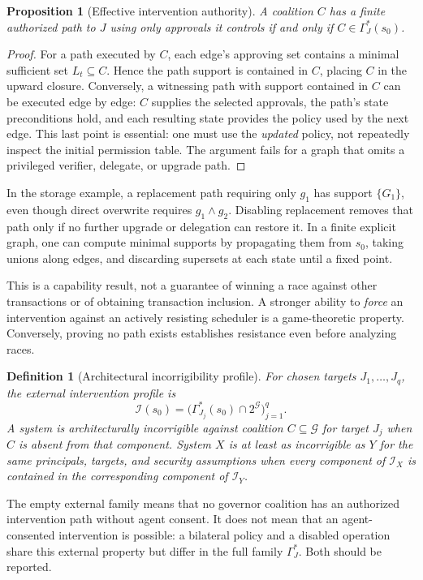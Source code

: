 \documentclass[10pt,letterpaper]{article}
\newtheorem{definition}{Definition}
\newtheorem{proposition}{Proposition}
\newcommand{\G}{\mathcal G}
\begin{document}
\begin{proposition}[Effective intervention authority]
\label{thm:closure}
A coalition $C$ has a finite authorized path to $J$ using only approvals it controls if and only if $C\in\Gamma_J^*(s_0)$.
\end{proposition}
\begin{proof}
For a path executed by $C$, each edge's approving set contains a minimal sufficient set $L_t\subseteq C$. Hence the path support is contained in $C$, placing $C$ in the upward closure. Conversely, a witnessing path with support contained in $C$ can be executed edge by edge: $C$ supplies the selected approvals, the path's state preconditions hold, and each resulting state provides the policy used by the next edge. This last point is essential: one must use the \emph{updated} policy, not repeatedly inspect the initial permission table. The argument fails for a graph that omits a privileged verifier, delegate, or upgrade path.
\end{proof}

In the storage example, a replacement path requiring only $g_1$ has support $\{G_1\}$, even though direct overwrite requires $g_1\land g_2$. Disabling replacement removes that path only if no further upgrade or delegation can restore it. In a finite explicit graph, one can compute minimal supports by propagating them from $s_0$, taking unions along edges, and discarding supersets at each state until a fixed point.

This is a capability result, not a guarantee of winning a race against other transactions or of obtaining transaction inclusion. A stronger ability to \emph{force} an intervention against an actively resisting scheduler is a game-theoretic property. Conversely, proving no path exists establishes resistance even before analyzing races.

\begin{definition}[Architectural incorrigibility profile]
For chosen targets $J_1,\ldots,J_q$, the external intervention profile is
\[
 \mathcal I(s_0)=\bigl(\Gamma_{J_j}^*(s_0)\cap2^{\G}\bigr)_{j=1}^q.
\]
A system is architecturally incorrigible against coalition $C\subseteq\G$ for target $J_j$ when $C$ is absent from that component. System $X$ is at least as incorrigible as $Y$ for the same principals, targets, and security assumptions when every component of $\mathcal I_X$ is contained in the corresponding component of $\mathcal I_Y$.
\end{definition}
The empty external family means that no governor coalition has an authorized intervention path without agent consent. It does not mean that an agent-consented intervention is possible: a bilateral policy and a disabled operation share this external property but differ in the full family $\Gamma_J^*$. Both should be reported.
\end{document}
